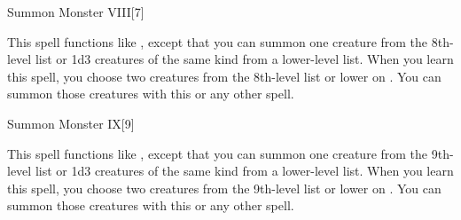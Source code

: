 \begin{spellsection}{Summon Monster VIII}[7]
    \begin{spellheader}
    \end{spellheader}
    \begin{spellcontent}
        \begin{spelltargetinginfo}
        \end{spelltargetinginfo}
        \begin{spelleffects}
            \spellspecial This spell functions like , except that you can summon one creature from the 8th-level list or 1d3 creatures of the same kind from a lower-level list. When you learn this spell, you choose two creatures from the 8th-level list or lower on . You can summon those creatures with this or any other  spell.
            \spelldur \durshort \dismissable
        \end{spelleffects}
    \end{spellcontent}
    \begin{spellfooter}
        \miscastexplode
    \end{spellfooter}
\end{spellsection}

\begin{spellsection}{Summon Monster IX}[9]
    \begin{spellheader}
    \end{spellheader}
    \begin{spellcontent}
        \begin{spelltargetinginfo}
        \end{spelltargetinginfo}
        \begin{spelleffects}
            \spellspecial This spell functions like , except that you can summon one creature from the 9th-level list or 1d3 creatures of the same kind from a lower-level list. When you learn this spell, you choose two creatures from the 9th-level list or lower on . You can summon those creatures with this or any other  spell.

            \spelldur \durshort \dismissable
        \end{spelleffects}
    \end{spellcontent}
    \begin{spellfooter}
        \miscastexplode
    \end{spellfooter}
\end{spellsection}

